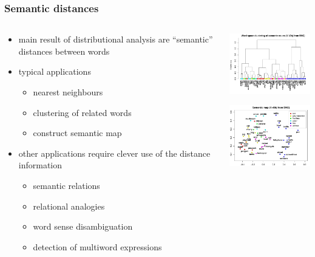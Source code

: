 \begin{frame}
  \frametitle{Semantic distances}

  \begin{columns}[T]
    \begin{column}{55mm}
      \begin{itemize}
      \item main result of distributional analysis are ``semantic'' distances between words
      \item typical applications
        \begin{itemize}
        \item nearest neighbours
        \item clustering of related words
        \item construct semantic map
        \end{itemize}
      \item other applications require clever use of the distance information
        \begin{itemize}
        \item semantic relations
        \item relational analogies
        \item word sense disambiguation
        \item detection of multiword expressions
        \end{itemize}
      \end{itemize}
    \end{column}
    \begin{column}{55mm}
      \ungap[1]
      \includegraphics[width=50mm]{img/hieroglyph_clustering}

      \gap[1]
      \includegraphics[width=50mm]{img/hieroglyph_semantic_map}
    \end{column}
  \end{columns}
\end{frame}

